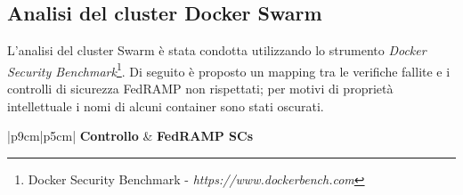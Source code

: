 \documentclass[../main.tex]{subfiles}
\begin{document}
\subsection{Analisi del cluster Docker Swarm}
\label{ref:dockerswarmanalysis}
L'analisi del cluster Swarm è stata condotta utilizzando lo strumento \textit{Docker Security Benchmark}\footnote{Docker Security Benchmark - \textit{https://www.dockerbench.com}}.
Di seguito è proposto un mapping tra le verifiche fallite e i controlli di sicurezza FedRAMP non rispettati; per motivi di proprietà intellettuale i nomi di alcuni container sono stati oscurati.
    \begin{ltabulary}{|p{9cm}|p{5cm}|}
        \hline
        \textbf{Controllo} & \textbf{FedRAMP SCs} \\
        \hline
        \endhead


\end{ltabulary}
\end{document}
